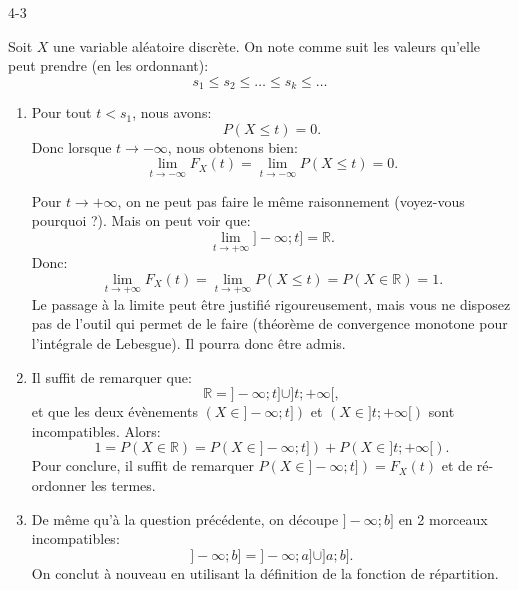 \begin{corrige}{4-3}

Soit $X$ une variable aléatoire discrète. On note comme suit les valeurs qu'elle peut prendre (en les ordonnant):
\[
 s_1 \leq s_2 \leq \ldots \leq s_k \leq \ldots
\]

\begin{enumerate}

\item Pour tout $t < s_1$, nous avons:
\[
 P ( X \leq t ) = 0.
\]
Donc lorsque $t \rightarrow -\infty$, nous obtenons bien:
\[
 \lim_{t\rightarrow -\infty} F_X(t) = \lim_{t\rightarrow -\infty} P(X\leq t) = 0.
\]

Pour $t \rightarrow + \infty$, on ne peut pas faire le m\^eme raisonnement (voyez-vous pourquoi ?). Mais on peut voir que:
\[
 \lim_{t\rightarrow + \infty}] -\infty ; t ] = \mathbb{R}.
\]
Donc:
\[
 \lim_{t\rightarrow +\infty} F_X(t) = \lim_{t\rightarrow +\infty} P(X\leq t) = P(X \in \mathbb{R}) = 1.
\]
Le passage à la limite peut être justifié rigoureusement, mais vous ne disposez pas de l'outil qui permet de le faire (théorème de convergence monotone pour l'intégrale de Lebesgue). Il pourra donc être admis.

\item Il suffit de remarquer que:
\[
 \mathbb{R} = ] -\infty ; t] \cup ] t ; +\infty [,
\]
et que les deux évènements $(X \in ] -\infty ; t])$ et $(X \in ] t ; +\infty [)$ sont incompatibles. Alors:
\[
 1 = P(X \in \mathbb{R}) = P(X \in ] -\infty ; t]) + P(X \in ] t ; +\infty [).
\]
Pour conclure, il suffit de remarquer $P(X \in ] -\infty ; t]) = F_X(t)$ et de ré-ordonner les termes.

\item De même qu'à la question précédente, on découpe $] -\infty ; b ]$ en 2 morceaux incompatibles:
\[
  ] -\infty ; b ] = ] -\infty ; a] \cup ] a ; b ] .
\]
On conclut à nouveau en utilisant la définition de la fonction de répartition.

\end{enumerate}



\end{corrige}
